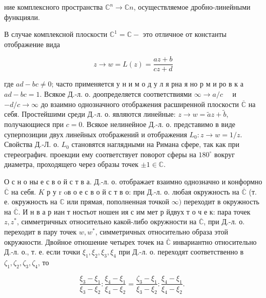 \documentclass[10pt]{article}
\begin{document}
ние комплексного пространства $\mathbb{C}^{n} \rightarrow \mathbb{C} n$, осуществляемое дробно-линейными функцияли.



В случае комплексной плоскости $\mathbb{C}^{1}=\mathbb{C}-$ это отличное от константы отображение вида



\[

z \longrightarrow w=L(z)=\frac{a z+b}{c z+d}

\]



где $a d-b c \neq 0$; часто применяется у н и м о д у л я рна я но р м и ро в к а $a d-b c=1$. Всякое Д.-л. о. доопределяется соответствиями $\infty \rightarrow a / c \quad$ и $-d / c \rightarrow \infty$ до взаимно однозначного отображения расширенной плоскости $\overline{\mathbb{C}}$ на себя. Простейшими среди Д.-л. о. являются линейные: $z \rightarrow w=\tilde{a} z+\tilde{b}$, получающиеся при $c=0$. Всякое нелинейное Д.-л. о. представимо в виде суперпозиции двух линейных отображений и отображения $L_{0}: z \rightarrow w=1 / z$. Свойства Д.-Л. о. $L_{0}$ становятся наглядными на Римана сфере, так как при стереографич. проекции ему соответствует поворот сферы на $180^{\circ}$ вокруг диаметра, проходящего через образы точек $\pm 1 \in \mathbb{C}$.



О с н о ны е с в о й с т в а. Д.-л. о. отображает взаимно однозначно и конформно $\overline{\mathbb{C}}$ на себя. $K$ р у $\mathrm{r}$ oв о е с в о й с т в о: при Д.-л. о. любая окружность на $\overline{\mathbb{C}}$ (т. е. окружность на $\mathbb{C}$ или прямая, пополненная точкой $\infty)$ переходит в окружность на $\overline{\mathbb{C}}$. И н в а р иан т ностьот ношен ия с им мет р йдвух т о ч е к: пара точек $z, z^{*}$, симметричных относительно какой-либо окружности на $\overline{\mathbb{C}}$, при Д.-л. о. переходит в пару точек $w, w^{*}$, симметричных относительно образа этой окружности. Двойное отношение четырех точек на $\overline{\mathbb{C}}$ инвариантно относительно Д.-л. о., т. е. если точки $\xi_{1}, \xi_{2}, \xi_{3}, \xi_{4}$ при Д.-л. о. переходят соответственно в $\zeta_{1}, \zeta_{2}, \zeta_{3}, \zeta_{4}$, то



\[

\frac{\xi_{3}-\xi_{1}}{\xi_{3}-\xi_{2}}: \frac{\xi_{4}-\xi_{1}}{\xi_{4}-\xi_{2}}=\frac{\zeta_{3}-\xi_{1}}{\xi_{3}-\xi_{2}}: \frac{\xi_{4}-\xi_{1}}{\xi_{4}-\xi_{2}} \text {. }

\]
\end{document}
